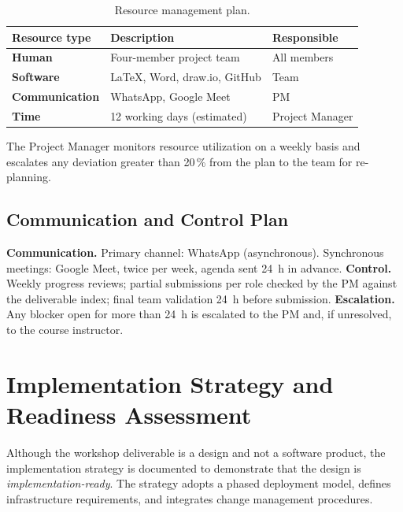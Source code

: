 \documentclass[conference,a4paper,10pt]{IEEEtran}
\begin{document}
\begin{table}[H]
\centering
\caption{Resource management plan.}
\label{tab:resources}
\renewcommand{\arraystretch}{1.2}
\footnotesize
\begin{tabularx}{\columnwidth}{>{\bfseries}l X l}
\toprule
\rowcolor{tableheader} Resource type & Description & Responsible \\
\midrule
Human         & Four-member project team             & All members \\
Software      & \LaTeX, Word, draw.io, GitHub        & Team \\
Communication & WhatsApp, Google Meet                & PM \\
Time          & 12 working days (estimated)          & Project Manager \\
\bottomrule
\end{tabularx}
\end{table}

The Project Manager monitors resource utilization on a weekly basis and
escalates any deviation greater than 20\,\% from the plan to the team for
re-planning.

\subsection{Communication and Control Plan}

\textbf{Communication.} Primary channel: WhatsApp (asynchronous). Synchronous
meetings: Google Meet, twice per week, agenda sent 24~h in advance.
\textbf{Control.} Weekly progress reviews; partial submissions per role
checked by the PM against the deliverable index; final team validation
24~h before submission. \textbf{Escalation.} Any blocker open for more
than 24~h is escalated to the PM and, if unresolved, to the course
instructor.

\section{Implementation Strategy and Readiness Assessment}
\label{sec:implementation}

Although the workshop deliverable is a design and not a software product,
the implementation strategy is documented to demonstrate that the design is
\emph{implementation-ready}. The strategy adopts a phased deployment model,
defines infrastructure requirements, and integrates change management
procedures.
\end{document}
